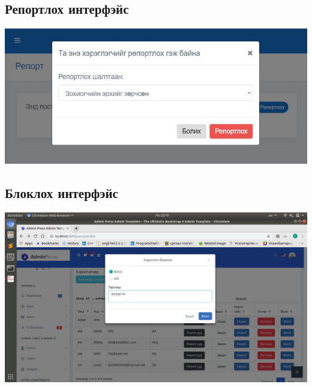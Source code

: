 \documentclass[
oneside, %
english, %
onehalfspacing, %
nolistspacing, %
headsepline, %
]{article} %
\begin{document}
      \subsection{Репортлох интерфэйс}
     \includegraphics[width=\textwidth]{delgets2}
     \subsection{ Блоклох интерфэйс}
     \includegraphics[width=\textwidth]{delgets3}
\end{document}
